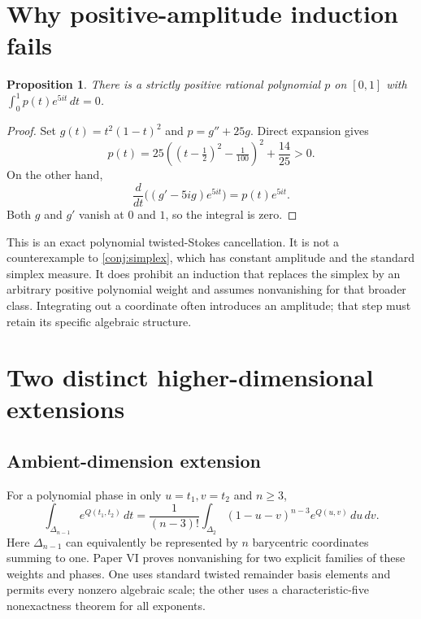 \documentclass[11pt]{article}
\numberwithin{equation}{section}
\newtheorem{proposition}[proposition]{Proposition}
\theoremstyle{definition}
\theoremstyle{remark}
\begin{document}
\section{Why positive-amplitude induction fails}
\begin{proposition}\label{prop:counterexample}
There is a strictly positive rational polynomial $p$ on $[0,1]$ with
$\int_0^1 p(t)e^{5it}\,dt=0$.
\end{proposition}
\begin{proof}
Set $g(t)=t^2(1-t)^2$ and $p=g''+25g$. Direct expansion gives
\[
 p(t)=25\left((t-\tfrac12)^2-\tfrac1{100}\right)^2+\frac{14}{25}>0.
\]
On the other hand,
\[
 \frac{d}{dt}\bigl((g'-5ig)e^{5it}\bigr)=p(t)e^{5it}.
\]
Both $g$ and $g'$ vanish at $0$ and $1$, so the integral is zero.
\end{proof}
This is an exact polynomial twisted-Stokes cancellation. It is not a
counterexample to \cref{conj:simplex}, which has constant amplitude and
the standard simplex measure. It does prohibit an induction that replaces
the simplex by an arbitrary positive polynomial weight and assumes
nonvanishing for that broader class. Integrating out a coordinate often
introduces an amplitude; that step must retain its specific algebraic
structure.

\section{Two distinct higher-dimensional extensions}
\subsection{Ambient-dimension extension}
For a polynomial phase in only $u=t_1,v=t_2$ and $n\ge3$,
\[
 \int_{\Delta_{n-1}}e^{Q(t_1,t_2)}\,dt
 =\frac1{(n-3)!}\int_{\Delta_2}(1-u-v)^{n-3}e^{Q(u,v)}\,du\,dv.
\]
Here $\Delta_{n-1}$ can equivalently be represented by $n$ barycentric
coordinates summing to one. Paper VI proves nonvanishing for two explicit
families of these weights and phases. One uses standard twisted remainder
basis elements and permits every nonzero algebraic scale; the other uses
a characteristic-five nonexactness theorem for all exponents.
\end{document}
